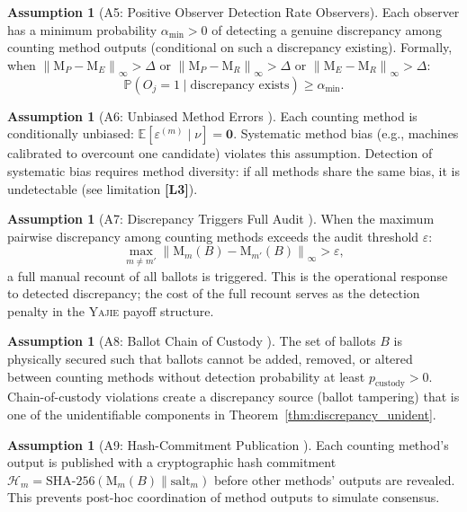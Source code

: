 \documentclass[11pt,a4paper]{article}
\theoremstyle{definition}
\newtheorem{assumption}[theorem]{Assumption}
\newcommand{\Yajie}{\textsc{Yajie}}
\newcommand{\E}{\mathbb{E}}
\newcommand{\Pbb}{\mathbb{P}}
\newcommand{\norm}[1]{\left\lVert#1\right\rVert}
\newcommand{\method}[1]{\mathrm{M}_{#1}}
\newcommand{\limitationTag}[1]{\textsf{\textbf{[L#1]}}}
\begin{document}
\begin{assumption}[A5: Positive Observer Detection Rate Observers]
\label{ass:A5}
Each observer has a minimum probability $\alpha_{\min} > 0$ of detecting a genuine discrepancy among counting method outputs (conditional on such a discrepancy existing). Formally, when $\norm{\method{P} - \method{E}}_\infty > \Delta$ or $\norm{\method{P} - \method{R}}_\infty > \Delta$ or $\norm{\method{E} - \method{R}}_\infty > \Delta$:
\begin{equation}
    \Pbb(O_j = 1 \mid \text{discrepancy exists}) \geq \alpha_{\min}.
    \label{eq:observer_rate}
\end{equation}
\end{assumption}
\begin{assumption}[A6: Unbiased Method Errors ]
\label{ass:A6}
Each counting method is conditionally unbiased: $\E[\varepsilon^{(m)} \mid \nu] = \mathbf{0}$. Systematic method bias (e.g., machines calibrated to overcount one candidate) violates this assumption. Detection of systematic bias requires method diversity: if all methods share the same bias, it is undetectable (see limitation \limitationTag{3}).
\end{assumption}
\begin{assumption}[A7: Discrepancy Triggers Full Audit ]
\label{ass:A7}
When the maximum pairwise discrepancy among counting methods exceeds the audit threshold $\varepsilon$:
\begin{equation}
    \max_{m \neq m'} \norm{\method{m}(B) - \method{m'}(B)}_\infty > \varepsilon,
    \label{eq:trigger}
\end{equation}
a full manual recount of all ballots is triggered. This is the operational response to detected discrepancy; the cost of the full recount serves as the detection penalty in the \Yajie{} payoff structure.
\end{assumption}
\begin{assumption}[A8: Ballot Chain of Custody ]
\label{ass:A8}
The set of ballots $B$ is physically secured such that ballots cannot be added, removed, or altered between counting methods without detection probability at least $p_{\text{custody}} > 0$. Chain-of-custody violations create a discrepancy source (ballot tampering) that is one of the unidentifiable components in Theorem~\ref{thm:discrepancy_unident}.
\end{assumption}
\begin{assumption}[A9: Hash-Commitment Publication ]
\label{ass:A9}
Each counting method's output is published with a cryptographic hash commitment $\mathcal{H}_m = \text{SHA-256}(\method{m}(B) \| \text{salt}_m)$ before other methods' outputs are revealed. This prevents post-hoc coordination of method outputs to simulate consensus.
\end{assumption}
\end{document}
